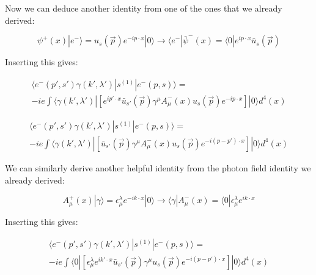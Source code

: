 \documentclass[a4]{article}
\begin{document}
\begin{framed}
        Now we can deduce another identity from one of the ones that we already derived:

        \begin{equation}
            \psi^{+} (x) | e^{-} \rangle = u_{s} (\vec{p}) e^{- i p \cdot x} | 0 \rangle \rightarrow \langle e^{-} | \bar{\psi}^{-} (x) = \langle 0 | e^{i p \cdot x} \bar{u}_{s} (\vec{p})
        \end{equation}

        Inserting this gives: 

        \begin{equation}
            \begin{aligned}
                \langle e^{-} (p', s') \gamma (k', \lambda') | s^{(1)} | e^{-} (p, s) \rangle = \\
                - i e \int \langle\gamma (k', \lambda') | [e^{i p' \cdot x} \bar{u}_{s'} (\vec{p}) \gamma^{\mu} A_{\mu}^{-} (x) u_{s} (\vec{p}) e^{- i p \cdot x}] | 0 \rangle d^{4} (x)
            \end{aligned}
        \end{equation}

        \begin{equation}
            \begin{aligned}
                \langle e^{-} (p', s') \gamma (k', \lambda') | s^{(1)} | e^{-} (p, s) \rangle = \\
                - i e \int \langle\gamma (k', \lambda') | [\bar{u}_{s'} (\vec{p}) \gamma^{\mu} A_{\mu}^{-} (x) u_{s} (\vec{p}) e^{- i (p - p') \cdot x}] | 0 \rangle d^{4} (x)
            \end{aligned}
        \end{equation}

        We can similarly derive another helpful identity from the photon field identity we already derived:

        \begin{equation}
            A_{\mu}^{+} (x) | \gamma \rangle = \epsilon^{\lambda}_{\mu} e^{- i k \cdot x} | 0 \rangle \rightarrow \langle \gamma | A_{\mu}^{-} (x) = \langle 0 | \epsilon^{\lambda}_{\mu} e^{i k \cdot x}
        \end{equation}

        Inserting this gives:

        \begin{equation}
            \begin{aligned}
                \langle e^{-} (p', s') \gamma (k', \lambda') | s^{(1)} | e^{-} (p, s) \rangle = \\
                - i e \int \langle 0 | [\epsilon^{\lambda}_{\mu} e^{i k' \cdot x} \bar{u}_{s'} (\vec{p}) \gamma^{\mu} u_{s} (\vec{p}) e^{- i (p - p') \cdot x}] | 0 \rangle d^{4} (x)
            \end{aligned}
        \end{equation}


\end{framed}
\end{document}
